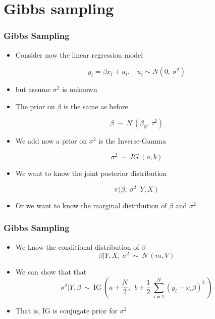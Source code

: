 \documentclass[
  shownotes,
  xcolor={svgnames},
  hyperref={colorlinks,citecolor=DarkBlue,linkcolor=DarkRed,urlcolor=DarkBlue}
  , aspectratio=169]{beamer}
\begin{document}
 \section{Gibbs sampling}
\begin{frame}[fragile]
\frametitle{Gibbs Sampling} 


\begin{itemize}

\item Consider now the linear regression model

$$y_{i} = \beta x_{i} + u_{i},\ \ \ \ u_{i}\sim N(0,\ \sigma^{2})$$

\item but assume $\sigma^{2}$ is unknown

\item The prior on $\beta$ is the same as before

$$\beta\ \sim\ N\ (\beta_{0},\ \tau^{2})$$

\item We add now a prior on $\sigma^{2}$ is the Inverse-Gamma

$$\sigma^{2}\ \sim\ IG\ (a,b)$$

\item We want to know the joint posterior distribution

$$\pi (\beta,\ {\sigma}^{2}\ \left| Y,X \right)$$

\item Or we want to know the marginal distribution of $\beta$ and $\sigma^{2}$
\end{itemize}
\end{frame}
\begin{frame}[fragile]
\frametitle{Gibbs Sampling} 



\begin{itemize}

\item We  know the conditional distribution of $\beta$
\medskip
$$\beta|Y,X,\ \sigma^{2}\ \sim\ N\ (m,V)$$
\medskip
\item We can show that that
\medskip
$$\sigma^{2}|Y,\beta\ \sim\ \text{IG}\ \left( a + \frac{N}{2},\ \ b + \frac{1}{2}\ \sum_{i = 1}^{N}\left( y_{i} - x_{i}\beta \right)^{2}\  \right)$$
\medskip

\item That is, IG is conjugate prior for $\sigma^{2}$
\end{itemize}
 \end{frame}
\end{document}
